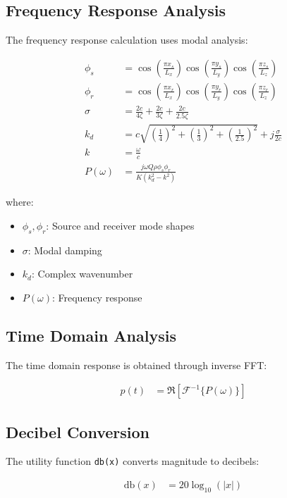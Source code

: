 \documentclass{article}
\begin{document}
\subsection{Frequency Response Analysis}
The frequency response calculation uses modal analysis:

\begin{align}
\phi_s &= \cos\left(\frac{\pi x_s}{L_x}\right)\cos\left(\frac{\pi y_s}{L_y}\right)\cos\left(\frac{\pi z_s}{L_z}\right) \\
\phi_r &= \cos\left(\frac{\pi x_r}{L_x}\right)\cos\left(\frac{\pi y_r}{L_y}\right)\cos\left(\frac{\pi z_r}{L_z}\right) \\
\sigma &= \frac{2c}{4\zeta} + \frac{2c}{3\zeta} + \frac{2c}{2.5\zeta} \\
k_d &= c\sqrt{\left(\frac{1}{4}\right)^2 + \left(\frac{1}{3}\right)^2 + \left(\frac{1}{2.5}\right)^2} + j\frac{\sigma}{2c} \\
k &= \frac{\omega}{c} \\
P(\omega) &= \frac{j\omega Q\rho\phi_s\phi_r}{K(k_d^2 - k^2)}
\end{align}

where:
\begin{itemize}
    \item $\phi_s, \phi_r$: Source and receiver mode shapes
    \item $\sigma$: Modal damping
    \item $k_d$: Complex wavenumber
    \item $P(\omega)$: Frequency response
\end{itemize}

\subsection{Time Domain Analysis}
The time domain response is obtained through inverse FFT:

\begin{align}
p(t) &= \Re\left[\mathcal{F}^{-1}\{P(\omega)\}\right]
\end{align}

\subsection{Decibel Conversion}
The utility function \texttt{db(x)} converts magnitude to decibels:

\begin{align}
\text{db}(x) &= 20\log_{10}(|x|)
\end{align}
\end{document}
